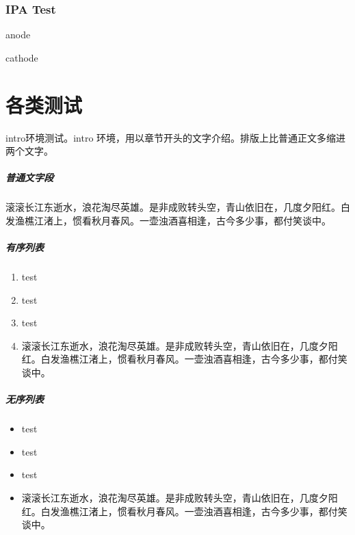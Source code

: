 \documentclass{../../PublicResources/DocClass}
\begin{document}
    \subsection{IPA Test}
    anode 

    cathode 

    \chapter{各类测试}

    \begin{intro}
        intro环境测试。intro 环境，用以章节开头的文字介绍。排版上比普通正文多缩进两个文字。
    \end{intro}

    \paragraph{普通文字段} 滚滚长江东逝水，浪花淘尽英雄。是非成败转头空，青山依旧在，几度夕阳红。白发渔樵江渚上，惯看秋月春风。一壶浊酒喜相逢，古今多少事，都付笑谈中。

    \paragraph{有序列表}
    \begin{enumerate}[label={Step \arabic*.}]
        \item test
        \item test
        \item test
        \item 滚滚长江东逝水，浪花淘尽英雄。是非成败转头空，青山依旧在，几度夕阳红。白发渔樵江渚上，惯看秋月春风。一壶浊酒喜相逢，古今多少事，都付笑谈中。
    \end{enumerate}

    \paragraph{无序列表}
    \begin{itemize}
        \item test
        \item test
        \item test
        \item 滚滚长江东逝水，浪花淘尽英雄。是非成败转头空，青山依旧在，几度夕阳红。白发渔樵江渚上，惯看秋月春风。一壶浊酒喜相逢，古今多少事，都付笑谈中。
    \end{itemize}
\end{document}
